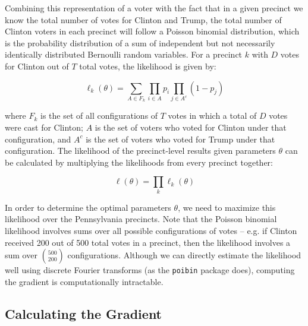 \documentclass[10pt, letterpaper]{article}
\begin{document}
Combining this representation of a voter with the fact that in a given precinct we know the total number of votes for Clinton and Trump, the total number of Clinton voters in each precinct will follow a Poisson binomial distribution, which is the probability distribution of a sum of independent but not necessarily identically distributed Bernoulli random variables\cite{Poibi}. For a precinct $k$ with $D$ votes for Clinton out of $T$ total votes, the likelihood is given by:

$$\ell_k(\theta) = \sum_{A \in F_k} \prod_{i \in A} p_i \prod_{j \in A^c}(1 - p_j)$$

where $F_k$ is the set of all configurations of $T$ votes in which a total of $D$ votes were cast for Clinton; $A$ is the set of voters who voted for Clinton under that configuration, and $A^c$ is the set of voters who voted for Trump under that configuration. The likelihood of the precinct-level results given parameters $\theta$ can be calculated by multiplying the likelihoods from every precinct together:

$$\ell(\theta) = \prod_k \ell_k(\theta)$$

In order to determine the optimal parameters $\theta$, we need to maximize this likelihood over the Pennsylvania precincts. Note that the Poisson binomial likelihood involves sums over all possible configurations of votes -- e.g. if Clinton received 200 out of 500 total votes in a precinct, then the likelihood involves a sum over $500 \choose 200$ configurations. Although we can directly estimate the likelihood well using discrete Fourier transforms (as the \texttt{poibin} package does\cite{PoibiGithub}), computing the gradient is computationally intractable.

\subsection{Calculating the Gradient}
\end{document}
